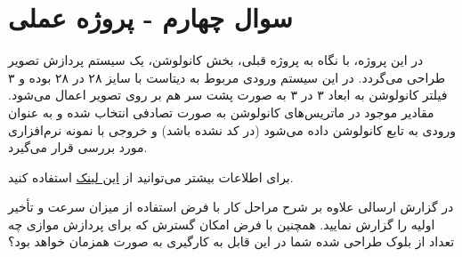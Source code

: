 \section{سوال چهارم - پروژه عملی}

در این پروژه، با نگاه به پروژه قبلی، بخش کانولوشن، یک سیستم پردازش تصویر طراحی می‌گردد. در این سیستم ورودی مربوط به دیتاست  با سایز ۲۸ در ۲۸ بوده و ۳ فیلتر کانولوشن به ابعاد ۳ در ۳ به صورت پشت سر هم بر روی تصویر اعمال می‌شود. مقادیر موجود در ماتریس‌های کانولوشن به صورت تصادفی انتخاب شده و به عنوان ورودی به تابع کانولوشن داده می‌شود (در کد  نشده باشد) و خروجی با نمونه نرم‌افزاری مورد بررسی قرار می‌گیرد.

برای اطلاعات بیشتر می‌توانید از
\href{https://serokell.io/blog/introduction-to-convolutional-neural-networks}{این لینک}
استفاده کنید.

در گزارش ارسالی علاوه بر شرح مراحل کار با فرض استفاده از  میزان سرعت و تأخیر اولیه را گزارش نمایید. همچنین با فرض امکان گسترش که برای پردازش موازی چه تعداد از بلوک طراحی شده شما در این  قابل به کارگیری به صورت همزمان خواهد بود؟

\begin{qsolve}
	
\end{qsolve}